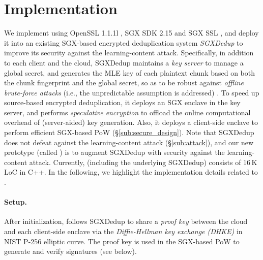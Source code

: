 \section{Implementation}
\label{sec:implementation}

We implement \sysnameF using OpenSSL 1.1.1l \cite{openssl}, SGX SDK 2.15 \cite{sgxsdk} and SGX SSL \cite{sgxssl}, and deploy it into an existing SGX-based encrypted deduplication system {\em SGXDedup} \cite{ren21} to improve its security against the learning-content attack. Specifically, in addition to each client and the cloud, SGXDedup maintains a {\em key server} to manage a global secret, and generates the MLE key of each plaintext chunk based on both the chunk fingerprint and the global secret, so as to be robust against {\em offline brute-force attacks} (i.e., the unpredictable assumption is addressed) \cite{bellare13b}. To speed up source-based encrypted deduplication, it deploys an SGX enclave in the key server, and performs {\em speculative encryption} \cite{eduardo19} to offload the online computational overhead of (server-aided) key generation. Also, it deploys a client-side enclave to perform efficient SGX-based PoW (\S\ref{sub:secure_design}).
Note that SGXDedup does not defeat against the learning-content attack (\S\ref{sub:attack}), and our new prototype (called \prototype) is to augment SGXDedup with security against the learning-content attack.
Currently, \prototype (including the underlying SGXDedup) consists of 16\,K LoC in C++.
In the following, we highlight the implementation details related to \prototype.








\paragraph{Setup.}
After initialization, \prototype follows SGXDedup to share a {\em proof key} between the cloud and each client-side enclave via the {\em Diffie-Hellman key exchange (DHKE)} in NIST P-256 elliptic curve. The proof key is used in the SGX-based PoW to generate and verify signatures (see below).




